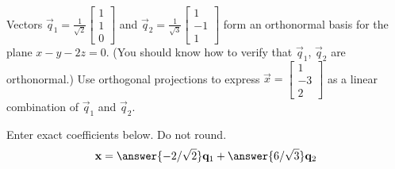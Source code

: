 \documentclass{ximera}
\author{}
\begin{document}
\begin{exercise}
Vectors $\vec{q}_1=\frac{1}{\sqrt{2}}\begin{bmatrix}1\\1\\0\end{bmatrix}$ and $\vec{q}_2=\frac{1}{\sqrt{3}}\begin{bmatrix}1\\-1\\1\end{bmatrix}$ form an orthonormal basis for the plane $x-y-2z=0$.  (You should know how to verify that $\vec{q}_1$, $\vec{q}_2$ are orthonormal.)  Use orthogonal projections to express $\vec{x}=\begin{bmatrix}1\\-3\\2\end{bmatrix}$ as a linear combination of $\vec{q}_1$ and $\vec{q}_2$.

Enter exact coefficients below.  Do not round.
$$\vec{x}=\answer{-2/\sqrt{2}}\vec{q}_1+\answer{6/\sqrt{3}}\vec{q}_2$$
 \end{exercise}
 
\end{document}
